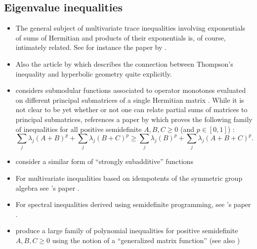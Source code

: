 \documentclass[notitlepage, 10pt]{article}
\begin{document}
\subsection{Eigenvalue inequalities}
\begin{itemize}
    \item The general subject of multivariate trace inequalities involving exponentials of sums of Hermitian and products of their exponentials is, of course, intimately related. See for instance the paper by \citeauthor{sutter2017multivariate} \cite{sutter2017multivariate}.
    \item Also the article \cite{forrester2014golden} by \citeauthor{forrester2014golden} which describes the connection between Thompson's inequality and hyperbolic geometry quite explicitly.
     \item \citeauthor{friedland2013submodular} considers submodular functions associated to operator monotones evaluated on different principal submatrices of a single Hermitian matrix \cite{friedland2013submodular}. While it is not clear to be yet whether or not one can relate partial sums of matrices to principal submatrices, \cite{friedland2013submodular} references a paper by \citeauthor{bouhtou2008optimization} \cite{bouhtou2008optimization} which proves the following family of inequalities for all positive semidefinite $A,B,C \geq 0$ (and $p \in [0,1]$) \cite[Lemma 5.3]{bouhtou2008optimization}:
        \begin{equation}
            \sum_{j}\lambda_j(A+B)^p + \sum_{j}\lambda_j(B+C)^p \geq \sum_{j}\lambda_j(B)^p + \sum_{j}\lambda_j(A+B+C)^p.
        \end{equation}
    \item \citeauthor{audenaert2010strongly} consider a similar form of ``strongly subadditive'' functions \cite{audenaert2010strongly}
    \item For multivariate inequalities based on idempotents of the symmetric group algebra see \citeauthor{huber2020positive}'s paper \cite{huber2020positive}.
    \item For spectral inequalities derived using semidefinite programming, see \citeauthor{huber2022refuting}'s paper \cite{huber2022refuting}.
    \item \citeauthor{paksoy2014inequalities} produce a large family of polynomial inequalities for positive semidefinite $A,B,C \geq 0$ using the notion of a ``generalized matrix function'' \cite{paksoy2014inequalities} (see also \cite{huber2021matrix,marcus1965generalized})
\end{itemize}
\end{document}
